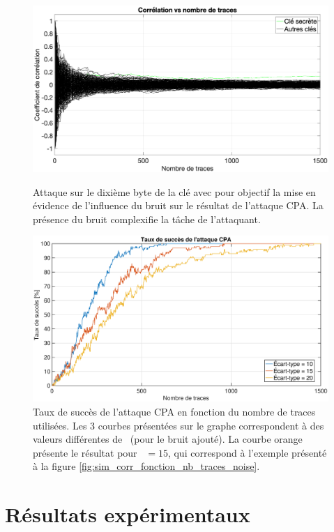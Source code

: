 \documentclass[oneside]{book}
\begin{document}
\begin{figure}[htbp]
    \hspace{-2.3cm}
    \includegraphics[scale=0.4]{image/sim_corr_fonction_nb_traces_noise}
    \caption{Attaque sur le dixième byte de la clé avec pour objectif la mise en évidence de l'influence du bruit sur le résultat de l'attaque CPA. La présence du bruit complexifie la tâche de l'attaquant.}
    \label{fig:sim_corr_fonction_nb_traces_noise} 
    \hspace{-2.2cm}
    \includegraphics[scale=0.4]{image/success_rate_sim}
    \caption{Taux de succès de l'attaque CPA en fonction du nombre de traces utilisées. Les 3 courbes présentées sur le graphe correspondent à des valeurs différentes de \sigma \ (pour le bruit ajouté). La courbe orange présente le résultat pour \sigma \ $= 15$, qui correspond à l'exemple présenté à la figure \ref{fig:sim_corr_fonction_nb_traces_noise}.}
    \label{fig:success_rate_sim} 
\end{figure}

\newpage

\section{Résultats expérimentaux }
\label{sec:Exp_results_CPA}
\end{document}
